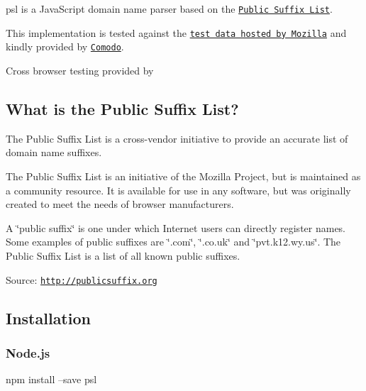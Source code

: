 \href{https://nodei.co/npm/psl/}{\tt }

\href{https://greenkeeper.io/}{\tt } \href{https://travis-ci.org/lupomontero/psl}{\tt } \href{https://david-dm.org/lupomontero/psl#info=devDependencies}{\tt }

{\ttfamily psl} is a {\ttfamily Java\+Script} domain name parser based on the \href{https://publicsuffix.org/}{\tt Public Suffix List}.

This implementation is tested against the \href{http://mxr.mozilla.org/mozilla-central/source/netwerk/test/unit/data/test_psl.txt?raw=1}{\tt test data hosted by Mozilla} and kindly provided by \href{https://www.comodo.com/}{\tt Comodo}.

Cross browser testing provided by \href{https://www.browserstack.com/}{\tt }

\subsection*{What is the Public Suffix List?}

The Public Suffix List is a cross-\/vendor initiative to provide an accurate list of domain name suffixes.

The Public Suffix List is an initiative of the Mozilla Project, but is maintained as a community resource. It is available for use in any software, but was originally created to meet the needs of browser manufacturers.

A \char`\"{}public suffix\char`\"{} is one under which Internet users can directly register names. Some examples of public suffixes are \char`\"{}.\+com\char`\"{}, \char`\"{}.\+co.\+uk\char`\"{} and \char`\"{}pvt.\+k12.\+wy.\+us\char`\"{}. The Public Suffix List is a list of all known public suffixes.

Source\+: \href{http://publicsuffix.org}{\tt http\+://publicsuffix.\+org}

\subsection*{Installation}

\subsubsection*{Node.\+js}


\begin{DoxyCode}
npm install --save psl
\end{DoxyCode}


